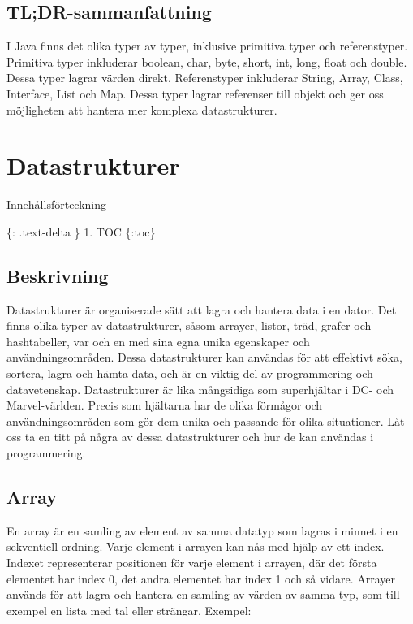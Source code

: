 \hypertarget{tldr-sammanfattning}{%
\subsection{TL;DR-sammanfattning}\label{tldr-sammanfattning}}

I Java finns det olika typer av typer, inklusive primitiva typer och
referenstyper. Primitiva typer inkluderar boolean, char, byte, short,
int, long, float och double. Dessa typer lagrar värden direkt.
Referenstyper inkluderar String, Array, Class, Interface, List och Map.
Dessa typer lagrar referenser till objekt och ger oss möjligheten att
hantera mer komplexa datastrukturer.

\hypertarget{datastrukturer}{%
\section{Datastrukturer}\label{datastrukturer}}

Innehållsförteckning

\{: .text-delta \} 1. TOC \{:toc\}

\hypertarget{beskrivning}{%
\subsection{Beskrivning}\label{beskrivning}}

Datastrukturer är organiserade sätt att lagra och hantera data i en
dator. Det finns olika typer av datastrukturer, såsom arrayer, listor,
träd, grafer och hashtabeller, var och en med sina egna unika egenskaper
och användningsområden. Dessa datastrukturer kan användas för att
effektivt söka, sortera, lagra och hämta data, och är en viktig del av
programmering och datavetenskap. Datastrukturer är lika mångsidiga som
superhjältar i DC- och Marvel-världen. Precis som hjältarna har de olika
förmågor och användningsområden som gör dem unika och passande för olika
situationer. Låt oss ta en titt på några av dessa datastrukturer och hur
de kan användas i programmering.

\hypertarget{array}{%
\subsection{Array}\label{array}}

En array är en samling av element av samma datatyp som lagras i minnet i
en sekventiell ordning. Varje element i arrayen kan nås med hjälp av ett
index. Indexet representerar positionen för varje element i arrayen, där
det första elementet har index 0, det andra elementet har index 1 och så
vidare. Arrayer används för att lagra och hantera en samling av värden
av samma typ, som till exempel en lista med tal eller strängar. Exempel:

